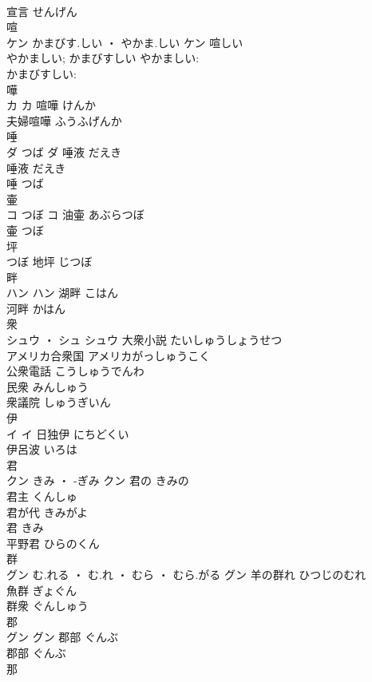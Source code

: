 \documentclass[8pt]{extreport}
\begin{document}
\begin{CJK}{UTF8}{min}
\\	宣言	せんげん	
\\	喧	
\\	ケン	かまびす.しい ・ やかま.しい	ケン	喧しい 
\\	やかましい; かまびすしい	やかましい: 
\\	かまびすしい: 
\\	嘩	
\\	カ		カ	喧嘩	けんか	
\\	夫婦喧嘩	ふうふげんか	
\\	唾	
\\	ダ	つば	ダ	唾液	だえき	
\\	唾液	だえき	
\\	唾	つば	
\\	壷	
\\	コ	つぼ	コ	油壷	あぶらつぼ	
\\	壷	つぼ	
\\	坪	
\\	つぼ														地坪	じつぼ	
\\	畔	
\\	ハン		ハン	湖畔	こはん	
\\	河畔	かはん	
\\	衆	
\\	シュウ ・ シュ		シュウ	大衆小説	たいしゅうしょうせつ	
\\	アメリカ合衆国	アメリカがっしゅうこく	
\\	公衆電話	こうしゅうでんわ	
\\	民衆	みんしゅう	
\\	衆議院	しゅうぎいん	
\\	伊	
\\	イ		イ	日独伊	にちどくい	
\\	伊呂波	いろは	
\\	君	
\\	クン	きみ ・ -ぎみ	クン	君の	きみの	
\\	君主	くんしゅ	
\\	君が代	きみがよ	
\\	君	きみ	
\\	平野君	ひらのくん	
\\	群	
\\	グン	む.れる ・ む.れ ・ むら ・ むら.がる	グン	羊の群れ	ひつじのむれ	
\\	魚群	ぎょぐん	
\\	群衆	ぐんしゅう	
\\	郡	
\\	グン		グン	郡部	ぐんぶ	
\\	郡部	ぐんぶ	
\\	那	

\end{CJK}
\end{document}
